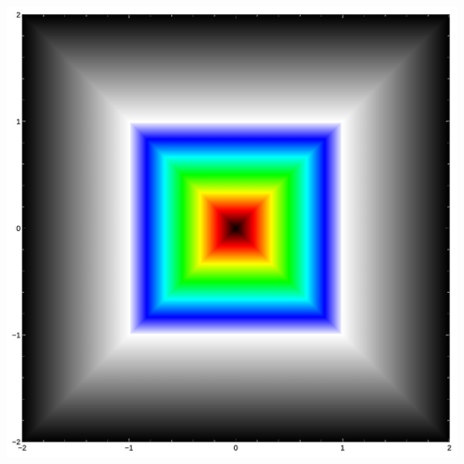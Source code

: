 \documentclass{beamer}
\begin{document}
\begin{frame}
\begin{columns}
\begin{column}{0.25\textwidth}
    \includegraphics[width=1.0\textwidth, right]{implicit_square.jpg}
  \end{column}
\end{columns}
\end{frame}
\end{document}

